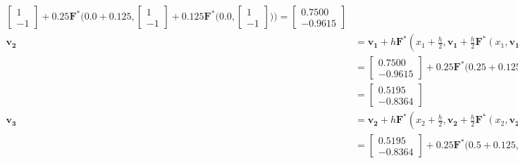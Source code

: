 \documentclass[a4paper, 12pt]{article}
\begin{document}
\begin{enumerate}
\begin{align*}
				\begin{bmatrix}
					1\\
					-1
				\end{bmatrix} + 0.25\mathbf{F^*}\bigg(0.0 + 0.125, 
				\begin{bmatrix}
					1\\
					-1
				\end{bmatrix} + 0.125\mathbf{F^*}\bigg(0.0, 
				\begin{bmatrix}
					1\\
					-1
				\end{bmatrix}\bigg)\bigg)=
				\begin{bmatrix}
					0.7500\\
					-0.9615
				\end{bmatrix}\\
				\mathbf{v_2}&=\mathbf{v_1} + h\mathbf{F^*}(x_1 + \frac{h}{2}, \mathbf{v_1}+\frac{h}{2}\mathbf{F^*}(x_1,\mathbf{v_1}))=\\&=
				\begin{bmatrix}
					0.7500\\
					-0.9615
				\end{bmatrix} + 0.25\mathbf{F^*}\bigg(0.25 + 0.125, 
				\begin{bmatrix}
					0.7500\\
					-0.9615
				\end{bmatrix} + 0.125\mathbf{F^*}\bigg(0.25, 
				\begin{bmatrix}
					0.7500\\
					-0.9615
				\end{bmatrix}\bigg)\bigg)=\\&=
				\begin{bmatrix}
					0.5195\\
					-0.8364
				\end{bmatrix}\\
				\mathbf{v_3}&=\mathbf{v_2} + h\mathbf{F^*}(x_2 + \frac{h}{2}, \mathbf{v_2}+\frac{h}{2}\mathbf{F^*}(x_2,\mathbf{v_2}))=\\&=
				\begin{bmatrix}
					0.5195\\
					-0.8364
				\end{bmatrix} + 0.25\mathbf{F^*}\bigg(0.5 + 0.125, 
				\begin{bmatrix}
					0.5195\\
					-0.8364
				\end{bmatrix} + 0.125\mathbf{F^*}\bigg(0.5, 
				\begin{bmatrix}
					0.5195\\

\end{bmatrix}
\end{align*}
\end{enumerate}
\end{document}
